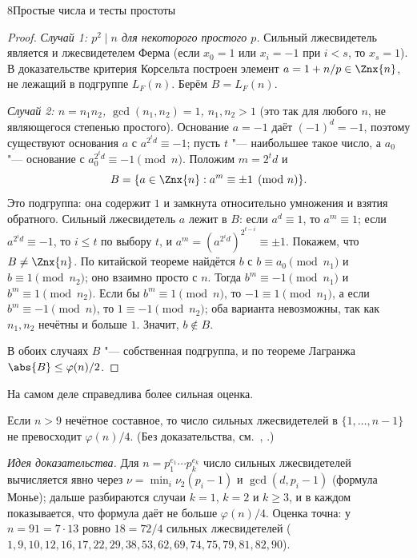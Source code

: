 \begin{lecture}{8}{Простые числа и тесты простоты}
\begin{proof}
\emph{Случай 1: $p^2 \mid n$ для некоторого простого $p$.} Сильный лжесвидетель является и
лжесвидетелем Ферма (если $x_0 = 1$ или $x_i = -1$ при $i < s$, то $x_s = 1$). В доказательстве
критерия Корсельта построен элемент $a = 1 + n/p \in \Znx{n}$, не лежащий в подгруппе $L_F(n)$.
Берём $B = L_F(n)$.

\emph{Случай 2: $n = n_1 n_2$, $\gcd(n_1, n_2) = 1$, $n_1, n_2 > 1$} (это так для любого $n$, не
являющегося степенью простого). Основание $a = -1$ даёт $(-1)^{d} = -1$, поэтому существуют
основания $a$ с $a^{2^t d} \equiv -1$; пусть $t$ "--- наибольшее такое число,
а $a_0$ "--- основание с $a_0^{2^t d} \equiv -1 \pmod n$. Положим $m = 2^t d$ и
\[
  B = \{a \in \Znx{n} : a^{m} \equiv \pm 1 \pmod n\}.
\]
Это подгруппа: она содержит $1$ и замкнута относительно умножения и взятия обратного.
Сильный лжесвидетель $a$ лежит в $B$: если $a^d \equiv 1$, то $a^{m} \equiv 1$; если
$a^{2^i d} \equiv -1$, то $i \le t$ по выбору $t$, и $a^{m} = (a^{2^i d})^{2^{t - i}} \equiv \pm 1$.
Покажем, что $B \ne \Znx{n}$. По китайской теореме найдётся $b$ с $b \equiv a_0 \pmod{n_1}$
и $b \equiv 1 \pmod{n_2}$; оно взаимно просто с $n$. Тогда $b^{m} \equiv -1 \pmod {n_1}$ и
$b^{m} \equiv 1 \pmod{n_2}$. Если бы $b^m \equiv 1 \pmod n$, то $-1 \equiv 1 \pmod{n_1}$, а
если $b^m \equiv -1 \pmod n$, то $1 \equiv -1 \pmod{n_2}$; оба варианта невозможны, так как
$n_1, n_2$ нечётны и больше $1$. Значит, $b \notin B$.

В обоих случаях $B$ "--- собственная подгруппа, и по теореме Лагранжа
$\abs{B} \le \varphi(n)/2$.
\end{proof}

На самом деле справедлива более сильная оценка.

\begin{theorem}\label{l8:monier-rabin}
Если $n > 9$ нечётное составное, то число сильных лжесвидетелей в $\{1, \ldots, n - 1\}$
не превосходит $\varphi(n)/4$. \textup{(Без доказательства, см.~\cite[разд.~3.5]{crandall-pomerance},
\cite{monier, rabin}.)}
\end{theorem}

\emph{Идея доказательства.} Для $n = p_1^{e_1} \cdots p_k^{e_k}$ число сильных лжесвидетелей
вычисляется явно через $\nu = \min_i \nu_2(p_i - 1)$ и $\gcd(d, p_i - 1)$ (формула Монье);
дальше разбираются случаи $k = 1$, $k = 2$ и $k \ge 3$, и в каждом показывается, что формула
даёт не больше $\varphi(n)/4$. Оценка точна: у $n = 91 = 7 \cdot 13$ ровно $18 = 72/4$ сильных
лжесвидетелей ($1, 9, 10, 12, 16, 17, 22, 29, 38, 53, 62, 69, 74, 75, 79, 81, 82, 90$).


\end{lecture}
